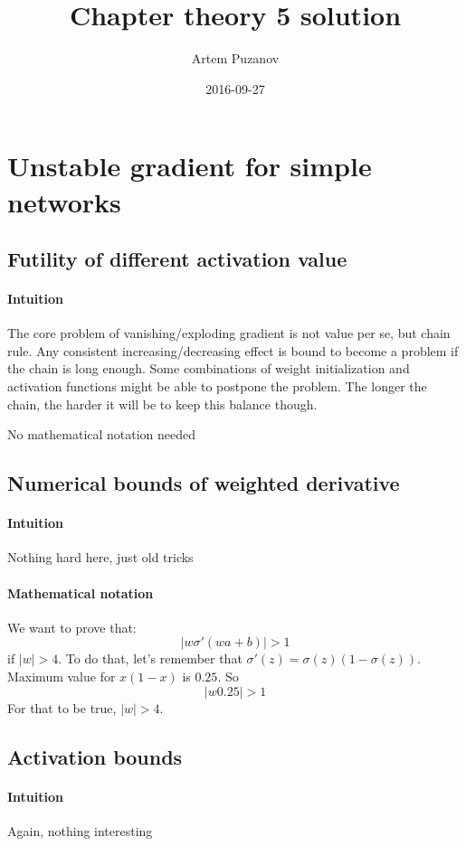 \documentclass{article}
\title{Chapter theory 5 solution}
\date{2016-09-27}
\author{Artem Puzanov}
\begin{document}
\maketitle
{}
\newpage
{}


\section{Unstable gradient for simple networks}
\subsection{Futility of different activation value}
\paragraph{Intuition}
The core problem of vanishing/exploding gradient is not value per se, but chain rule. 
Any consistent increasing/decreasing effect is bound to become a problem if the chain is long enough.
Some combinations of weight initialization and activation functions might be able to postpone the problem.
The longer the chain, the harder it will be to keep this balance though.

No mathematical notation needed

\subsection{Numerical bounds of weighted derivative}
\paragraph{Intuition}
Nothing hard here, just old tricks
\paragraph{Mathematical notation}

We want to prove that:
$$|w\sigma'(wa+b)| > 1$$
if $|w|> 4$. To do that, let's remember that $\sigma'(z) = \sigma(z)(1 - \sigma(z))$.
Maximum value for $x(1-x)$ is $0.25$. So 
$$|w 0.25| > 1$$
For that to be true, $|w| > 4$.

\subsection{Activation bounds}
\paragraph{Intuition}
Again, nothing interesting
\end{document}
